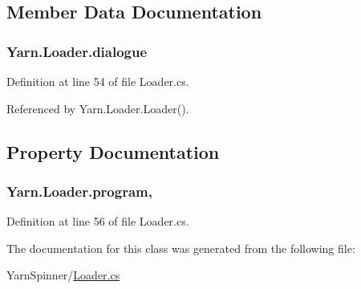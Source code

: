\subsection{Member Data Documentation}
\hypertarget{a00127_a89d1f29eba1c52c96c62a4cfe7859a1d}{
\subsubsection[{dialogue}]{ Yarn.\-Loader.\-dialogue\hspace{0.3cm}{\ttfamily [private]}}}\label{a00127_a89d1f29eba1c52c96c62a4cfe7859a1d}


Definition at line 54 of file Loader.\-cs.



Referenced by Yarn.\-Loader.\-Loader().



\subsection{Property Documentation}
\hypertarget{a00127_a6d8296076823c0c082df9024367f4860}{
\subsubsection[{program}]{ Yarn.\-Loader.\-program\hspace{0.3cm}{\ttfamily [get]}, {\ttfamily [set]}}}\label{a00127_a6d8296076823c0c082df9024367f4860}


Definition at line 56 of file Loader.\-cs.



The documentation for this class was generated from the following file\-:\begin{DoxyCompactItemize}
\item 
Yarn\-Spinner/\hyperlink{a00291}{Loader.\-cs}\end{DoxyCompactItemize}

